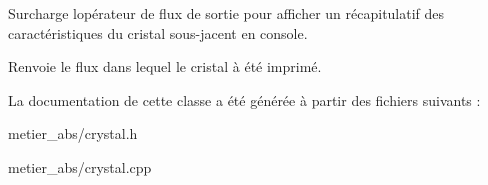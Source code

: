 Surcharge l\textquotesingle{}opérateur de flux de sortie pour afficher un récapitulatif des caractéristiques du cristal sous-\/jacent en console. \begin{DoxyReturn}{Renvoie}
le flux dans lequel le cristal à été imprimé. 
\end{DoxyReturn}


La documentation de cette classe a été générée à partir des fichiers suivants \+:\begin{DoxyCompactItemize}
\item 
metier\+\_\+abs/crystal.\+h\item 
metier\+\_\+abs/crystal.\+cpp\end{DoxyCompactItemize}
